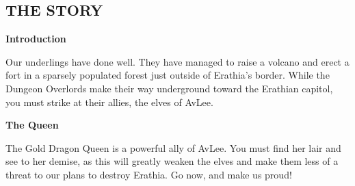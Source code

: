 \begin{multicols*}{2}

\vspace*{\fill}

\subsection*{\MakeUppercase{The Story}}


\textbf{Introduction}

Our underlings have done well.
They have managed to raise a volcano and erect a fort in a sparsely populated forest just outside of Erathia's border.
While the Dungeon Overlords make their way underground toward the Erathian capitol, you must strike at their allies, the elves of AvLee.

\textbf{The Queen}

The Gold Dragon Queen is a powerful ally of AvLee.
You must find her lair and see to her demise, as this will greatly weaken the elves and make them less of a threat to our plans to destroy Erathia.
Go now, and make us proud!

\columnbreak

\end{multicols*}

